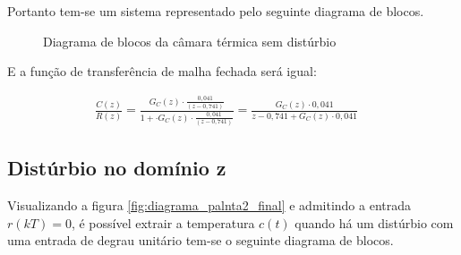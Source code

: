 \documentclass[a4paper,12pt]{article}
\begin{document}
			Portanto tem-se um sistema representado pelo seguinte diagrama de blocos.


		\begin{figure}[h]
		    \centering
		    \caption{Diagrama de blocos da câmara térmica sem distúrbio}
		\end{figure}
			
			E a função de transferência de malha fechada será igual:
			
			\begin{equation}
				\left.
				\begin{array}{c}
					\displaystyle \frac{C(z)}{R(z)} = \frac{G_C(z) \cdot \displaystyle \frac{0,041}{(z-0,741)}}{1 + \cdot G_C(z) \cdot \displaystyle \frac{0,041}{(z-0,741)} } = \frac{G_C(z) \cdot 0,041}{z - 0,741 + G_C(z) \cdot 0,041}
				\end{array}
				\right.
				\quad 
				\label{eq:ftma}
			\end{equation}
		
		\subsection{Distúrbio no domínio z}
			Visualizando a figura \ref{fig:diagrama_palnta2_final} e admitindo a entrada $r(kT)=0$, é possível extrair a temperatura $c(t)$ quando há um distúrbio com uma entrada de degrau unitário tem-se o seguinte diagrama de blocos.
			
\end{document}
